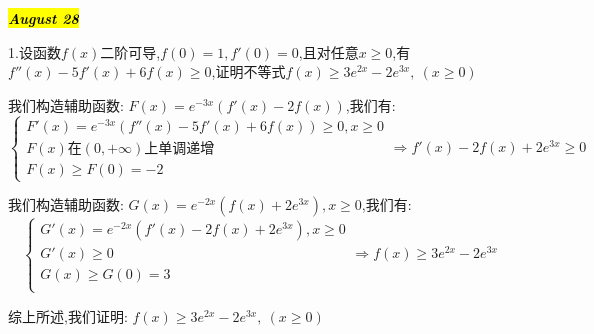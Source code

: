 \hl{\textbf{\textit{August 28}}}

1.设函数$f(x)$二阶可导,$f(0)=1,f'(0)=0$,且对任意$x\geq 0$,有$f''(x)-5f'(x)+6f(x)\geq 0$,证明不等式$f(x)\geq 3e^{2x}-2e^{3x},\ (x\geq 0)$
\begin{solution}

	我们构造辅助函数:  $F(x)=e^{-3x}(f'(x)-2f(x))$,我们有:  
	$$\left\lbrace
	\begin{array}{l}
		F'(x)=e^{-3x}(f''(x)-5f'(x)+6f(x))\geq 0,x\geq 0\\
		F(x)\text{在}(0,+\infty)\text{上单调递增}\\
		F(x)\geq F(0)=-2
	\end{array}
	\right. \Rightarrow f'(x)-2f(x)+2e^{3x}\geq 0$$
	
	我们构造辅助函数:  $G(x)=e^{-2x}(f(x)+2e^{3x}),x\geq 0$,我们有:  
	$$\left\lbrace
	\begin{array}{l}
		G'(x)=e^{-2x}(f'(x)-2f(x)+2e^{3x}),x\geq 0\\
		G'(x)\geq 0\\
		G(x)\geq G(0)=3\\
	\end{array}
	\right. \Rightarrow f(x)\geq 3e^{2x}-2e^{3x}$$
	
	综上所述,我们证明:  $f(x)\geq 3e^{2x}-2e^{3x},\ (x\geq 0)$
\end{solution}


